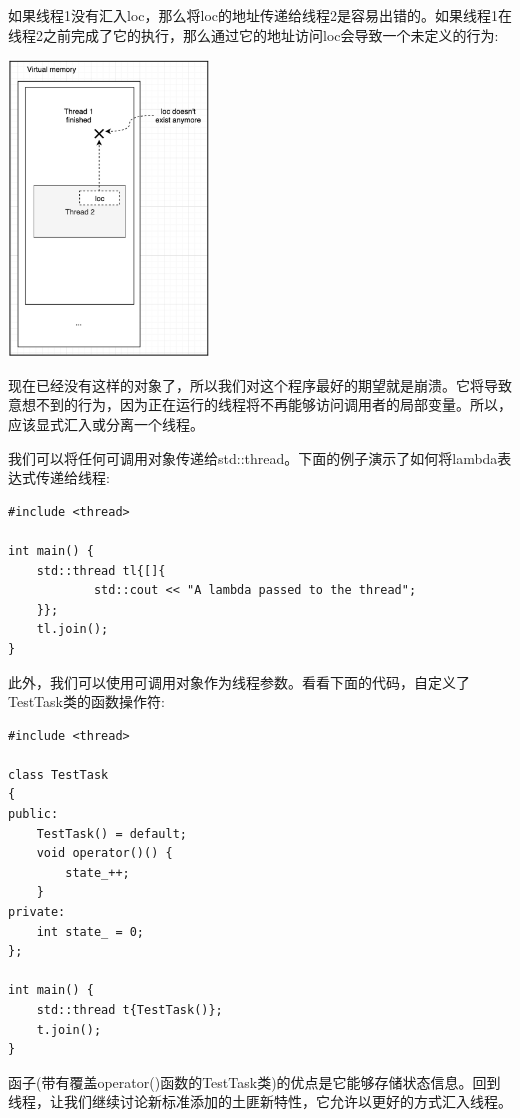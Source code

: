 如果线程1没有汇入loc，那么将loc的地址传递给线程2是容易出错的。如果线程1在线程2之前完成了它的执行，那么通过它的地址访问loc会导致一个未定义的行为: \par

\begin{center}
	\includegraphics[width=0.4\textwidth]{content/Section-2/Chapter-8/13}
\end{center}

现在已经没有这样的对象了，所以我们对这个程序最好的期望就是崩溃。它将导致意想不到的行为，因为正在运行的线程将不再能够访问调用者的局部变量。所以，应该显式汇入或分离一个线程。 \par
我们可以将任何可调用对象传递给std::thread。下面的例子演示了如何将lambda表达式传递给线程: \par

\begin{lstlisting}[caption={}]
#include <thread>

int main() {
	std::thread tl{[]{
			std::cout << "A lambda passed to the thread";
	}};
	tl.join();
}
\end{lstlisting}

此外，我们可以使用可调用对象作为线程参数。看看下面的代码，自定义了TestTask类的函数操作符: \par

\begin{lstlisting}[caption={}]
#include <thread>

class TestTask
{
public:
	TestTask() = default;
	void operator()() {
		state_++;
	}
private:
	int state_ = 0;
};

int main() {
	std::thread t{TestTask()};
	t.join();
}
\end{lstlisting}

函子(带有覆盖operator()函数的TestTask类)的优点是它能够存储状态信息。回到线程，让我们继续讨论新标准添加的土匪新特性，它允许以更好的方式汇入线程。 \par

